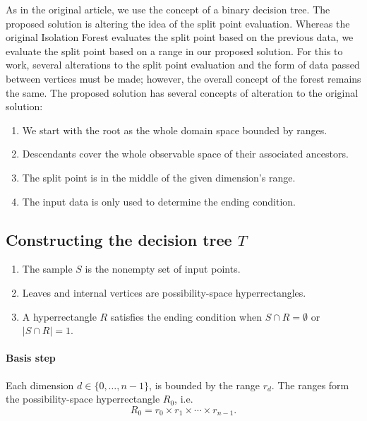 As in the original article, we use the concept of a binary decision tree. The proposed solution is altering the idea of the split point evaluation. Whereas the original Isolation Forest evaluates the split point based on the previous data, we
evaluate the split point based on a range in our proposed solution. For this to work, several alterations to the split point evaluation and the form of data passed between vertices must be made; however, the overall concept of the forest remains the same.
The proposed solution has several concepts of alteration to the original solution:

\begin{enumerate}
    \item We start with the root as the whole domain space bounded by ranges.
    \item Descendants cover the whole observable space of their associated ancestors. 
    \item The split point is in the middle of the given dimension’s range.
    \item The input data is only used to determine the ending condition.
\end{enumerate}

\subsection{Constructing the decision tree $T$}

\begin{enumerate}
    \item The sample \(S\) is the nonempty set of input points.
    \item Leaves and internal vertices are possibility-space hyperrectangles. 
    \item A hyperrectangle $R$ satisfies the ending condition when \(S \cap R = \emptyset\) or \(| S \cap R | = 1\).
\end{enumerate}



\paragraph{Basis step}
Each dimension \(d \in\{0, \dots, n-1\}\), is bounded by the range \(r_d\). The ranges form the possibility-space hyperrectangle \(R_0\), i.e.
\[R_0 =  r_0 \times r_1 \times \cdots \times r_{n-1}.\]

